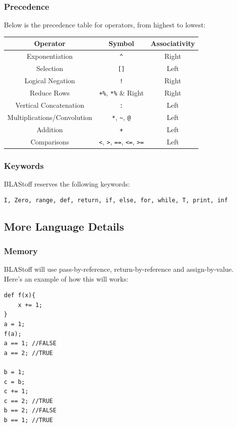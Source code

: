 \subsubsection{Precedence}
Below is the precedence table for operators, from highest to lowest:
\begin{center}
\begin{tabular}{|c|c|c|}
    \hline
    Operator &  Symbol & Associativity\\
    \hline
    Exponentiation & \verb|^| & Right\\
    \hline
    Selection & \verb|[]| & Left\\
    \hline
    Logical Negation & \verb|!| & Right\\
    \hline
    Reduce Rows & \verb|+%|, \verb|*%| & Right\\
    \hline
    Vertical Concatenation & \verb|:| & Left\\
    \hline
    Multiplications/Convolution &  \verb|*|, \verb|~|, \verb|@| & Left\\
    \hline
    Addition &  \verb|+| & Left\\
    \hline
    Comparisons &  \verb|<|, \verb|>|, \verb|==|, \verb|<=|, \verb|>=|  & Left\\
    \hline
\end{tabular}
\end{center}

\subsubsection{Keywords}
BLAStoff reserves the following keywords:
\begin{verbatim}
I, Zero, range, def, return, if, else, for, while, T, print, inf
\end{verbatim}

\subsection{More Language Details}
\subsubsection{Memory}
BLAStoff will use pass-by-reference, return-by-reference and assign-by-value.  Here's an example of how this will works:
\begin{lstlisting}
def f(x){
    x += 1;
}
a = 1;
f(a);
a == 1; //FALSE
a == 2; //TRUE

b = 1;
c = b;
c += 1;
c == 2; //TRUE
b == 2; //FALSE
b == 1; //TRUE
\end{lstlisting}

